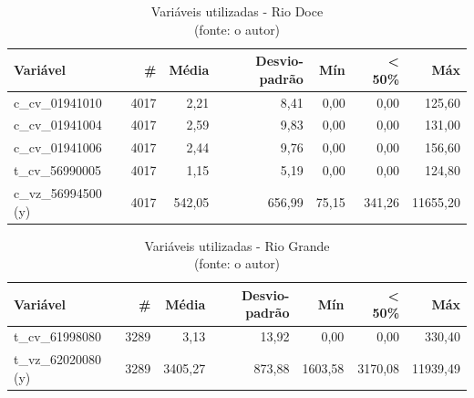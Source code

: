 \begin{table}[!h]
	\centering \small
	\caption{Variáveis utilizadas - Rio Doce \\(fonte: o autor)}
	\begin{tabular}{|l|r|r|r|r|r|r|} \hline 
		\textbf{Variável}   & \textbf{\#} & \textbf{Média} & \textbf{Desvio-padrão} & \textbf{Mín} & \textbf{< 50\%} & \textbf{Máx} \\\hline
		c\_cv\_01941010     & 4017        & 2,21           & 8,41                   & 0,00         & 0,00            & 125,60       \\\hline
		c\_cv\_01941004     & 4017        & 2,59           & 9,83                   & 0,00         & 0,00            & 131,00       \\\hline
		c\_cv\_01941006     & 4017        & 2,44           & 9,76                   & 0,00         & 0,00            & 156,60       \\\hline
		t\_cv\_56990005     & 4017        & 1,15           & 5,19                   & 0,00         & 0,00            & 124,80       \\\hline
		c\_vz\_56994500 (y) & 4017        & 542,05         & 656,99                 & 75,15        & 341,26          & 11655,20     \\\hline
	\end{tabular}
	\label{tab:variaveis_rio_doce}
\end{table}

\begin{table}[!h]
	\centering \small
	\caption{Variáveis utilizadas - Rio Grande \\(fonte: o autor)}
	\begin{tabular}{|l|r|r|r|r|r|r|} \hline 
		\textbf{Variável}   & \textbf{\#} & \textbf{Média} & \textbf{Desvio-padrão} & \textbf{Mín} & \textbf{< 50\%} & \textbf{Máx} \\\hline
		t\_cv\_61998080     & 3289        & 3,13           & 13,92                  & 0,00         & 0,00            & 330,40       \\\hline
		t\_vz\_62020080 (y) & 3289        & 3405,27        & 873,88                 & 1603,58      & 3170,08         & 11939,49     \\\hline
	\end{tabular}
	\label{tab:variaveis_rio_grande}
\end{table}

